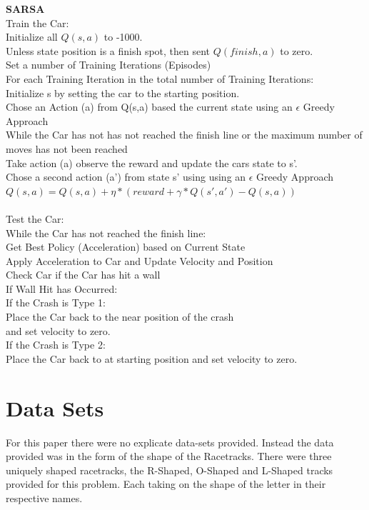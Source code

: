 \documentclass[twoside,11pt]{article}
\newcommand\tab[1][1cm]{\hspace*{#1}}
\begin{document}
\textbf{SARSA}\\
Train the Car:\\
\tab Initialize all $Q(s,a)$ to -1000.\\
\tab Unless state position is a finish spot, then sent $Q(finish,a)$ to zero.\\
\tab Set a number of Training Iterations (Episodes)\\
\tab For each Training Iteration in the total number of Training Iterations:\\
\tab \tab Initialize s by setting the car to the starting position.\\
\tab \tab Chose an Action (a) from Q(s,a) based the current state using an $\epsilon$ Greedy Approach \\
\tab \tab While the Car has not has not reached the finish line or the maximum number of moves has not been reached\\
\tab \tab \tab Take action (a) observe the reward and update the cars state to s'.\\
\tab \tab \tab Chose a second action (a') from state s' using using an $\epsilon$ Greedy Approach\\
\tab \tab \tab $Q(s,a) = Q(s,a) + \eta*(reward + \gamma * Q(s',a') - Q(s,a))$\\
\\
Test the Car:\\
\tab While the Car has not reached the finish line:\\
\tab \tab Get Best Policy (Acceleration) based on Current State\\
\tab \tab Apply Acceleration to Car and Update Velocity and Position\\
\tab \tab Check Car if the Car has hit a wall\\
\tab \tab If Wall Hit has Occurred:\\
\tab \tab \tab If the Crash is Type 1:\\
\tab \tab \tab \tab Place the Car back to the near position of the crash\\ 
\tab \tab \tab \tab and set velocity to zero.\\
\tab \tab \tab If the Crash is Type 2:\\
\tab \tab \tab \tab Place the Car back to at starting position and set velocity to zero.\\
\newpage


\section{Data Sets}
\hspace*{10mm} For this paper there were no explicate data-sets provided. Instead the data provided was in the form of the shape of the Racetracks. There were three uniquely shaped racetracks, the R-Shaped, O-Shaped and L-Shaped tracks provided for this problem. Each taking on the shape of the letter in their respective names.\\
	
\end{document}
